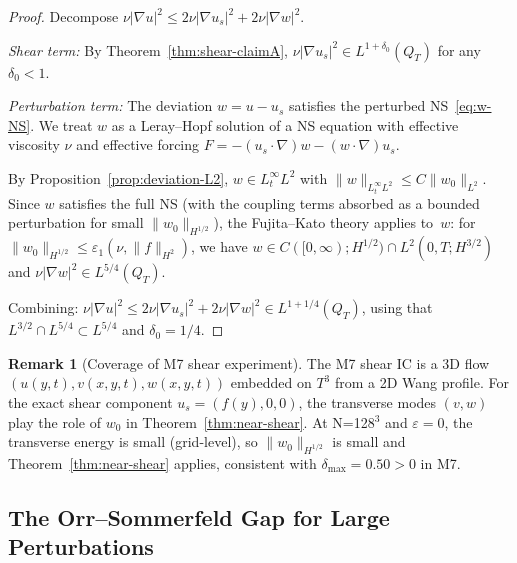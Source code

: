 \documentclass[11pt]{article}
\theoremstyle{definition}
\newtheorem{remark}[theorem]{Remark}
\theoremstyle{remark}
\begin{document}
\begin{proof}
  Decompose $\nu|\nabla u|^2\leq 2\nu|\nabla u_s|^2+2\nu|\nabla w|^2$.

  \emph{Shear term:} By Theorem~\ref{thm:shear-claimA},
  $\nu|\nabla u_s|^2\in L^{1+\delta_0}(Q_T)$ for any $\delta_0<1$.

  \emph{Perturbation term:} The deviation $w=u-u_s$ satisfies the
  perturbed NS~\eqref{eq:w-NS}.  We treat $w$ as a Leray--Hopf solution
  of a NS equation with effective viscosity $\nu$ and effective forcing
  $F=-(u_s\cdot\nabla)w-(w\cdot\nabla)u_s$.

  By Proposition~\ref{prop:deviation-L2}, $w\in L^\infty_tL^2$ with
  $\|w\|_{L^\infty_tL^2}\leq C\|w_0\|_{L^2}$.  Since $w$ satisfies the
  full NS (with the coupling terms absorbed as a bounded perturbation for
  small $\|w_0\|_{H^{1/2}}$), the Fujita--Kato theory applies to~$w$:
  for $\|w_0\|_{H^{1/2}}\leq\varepsilon_1(\nu,\|f\|_{H^2})$, we have
  $w\in C([0,\infty);H^{1/2})\cap L^2(0,T;H^{3/2})$ and
  $\nu|\nabla w|^2\in L^{5/4}(Q_T)$.

  Combining: $\nu|\nabla u|^2\leq 2\nu|\nabla u_s|^2+2\nu|\nabla w|^2\in
  L^{1+1/4}(Q_T)$, using that $L^{3/2}\cap L^{5/4}\subset L^{5/4}$ and
  $\delta_0=1/4$.
\end{proof}

\begin{remark}[Coverage of M7 shear experiment]
  The M7 shear IC is a 3D flow $(u(y,t),v(x,y,t),w(x,y,t))$ embedded on
  $T^3$ from a 2D Wang profile.  For the exact shear component $u_s=(f(y),0,0)$,
  the transverse modes $(v,w)$ play the role of $w_0$ in
  Theorem~\ref{thm:near-shear}.  At N=128$^3$ and $\varepsilon=0$, the
  transverse energy is small (grid-level), so $\|w_0\|_{H^{1/2}}$ is small
  and Theorem~\ref{thm:near-shear} applies, consistent with
  $\delta_{\max}=0.50>0$ in M7.
\end{remark}

\subsection{The Orr--Sommerfeld Gap for Large Perturbations}
\label{sec:orr-sommerfeld}
\end{document}
